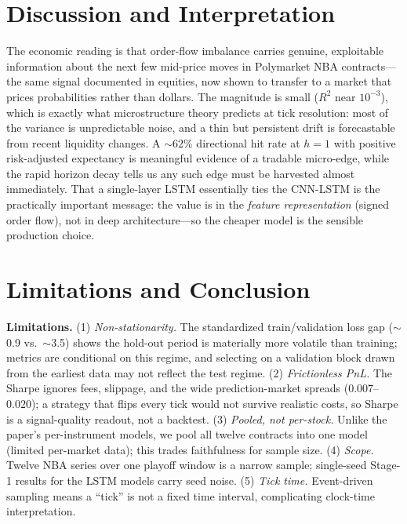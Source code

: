 \documentclass[10pt,twocolumn]{article}
\begin{document}
\section{Discussion and Interpretation}

The economic reading is that order-flow imbalance carries genuine, exploitable
information about the next few mid-price moves in Polymarket NBA contracts---the
same signal documented in equities, now shown to transfer to a market that prices
probabilities rather than dollars. The magnitude is small ($R^2$ near $10^{-3}$),
which is exactly what microstructure theory predicts at tick resolution: most of
the variance is unpredictable noise, and a thin but persistent drift is
forecastable from recent liquidity changes. A $\sim$62\% directional hit rate at
$h{=}1$ with positive risk-adjusted expectancy is meaningful evidence of a tradable
micro-edge, while the rapid horizon decay tells us any such edge must be harvested
almost immediately. That a single-layer LSTM essentially ties the CNN-LSTM is the
practically important message: the value is in the \emph{feature representation}
(signed order flow), not in deep architecture---so the cheaper model is the
sensible production choice.

\section{Limitations and Conclusion}
\label{sec:limits}

\textbf{Limitations.} (1) \emph{Non-stationarity.} The standardized
train/validation loss gap ($\sim$0.9 vs.\ $\sim$3.5) shows the hold-out period is
materially more volatile than training; metrics are conditional on this regime, and
selecting on a validation block drawn from the earliest data may not reflect the
test regime. (2) \emph{Frictionless PnL.} The Sharpe ignores fees, slippage, and
the wide prediction-market spreads ($0.007$--$0.020$); a strategy that flips every
tick would not survive realistic costs, so Sharpe is a signal-quality readout, not
a backtest. (3) \emph{Pooled, not per-stock.} Unlike the paper's per-instrument
models, we pool all twelve contracts into one model (limited per-market data);
this trades faithfulness for sample size. (4) \emph{Scope.} Twelve NBA series over
one playoff window is a narrow sample; single-seed Stage-1 results for the LSTM
models carry seed noise. (5) \emph{Tick time.} Event-driven sampling means a
``tick'' is not a fixed time interval, complicating clock-time interpretation.
\end{document}
